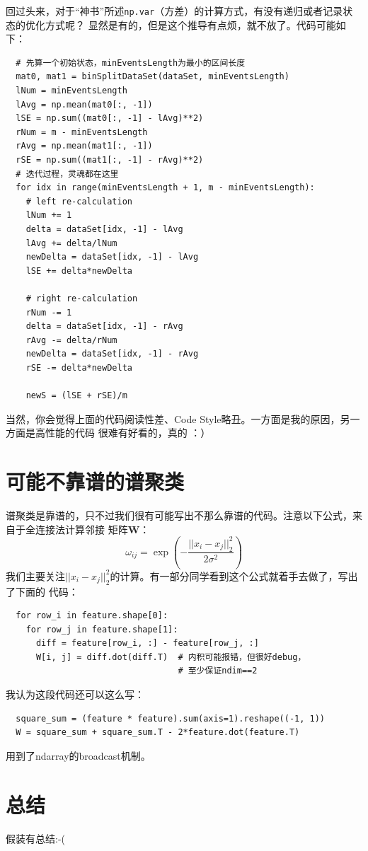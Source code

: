 \documentclass[12pt, a4paper]{article}
\begin{document}
回过头来，对于“神书”所述\texttt{np.var}（方差）的计算方式，有没有递归或者记录状态的优化方式呢？
显然是有的，但是这个推导有点烦，就不放了。代码可能如下：

\begin{lstlisting}
  # 先算一个初始状态，minEventsLength为最小的区间长度
  mat0, mat1 = binSplitDataSet(dataSet, minEventsLength)
  lNum = minEventsLength
  lAvg = np.mean(mat0[:, -1])
  lSE = np.sum((mat0[:, -1] - lAvg)**2)
  rNum = m - minEventsLength
  rAvg = np.mean(mat1[:, -1])
  rSE = np.sum((mat1[:, -1] - rAvg)**2)
  # 迭代过程，灵魂都在这里
  for idx in range(minEventsLength + 1, m - minEventsLength):
    # left re-calculation
    lNum += 1
    delta = dataSet[idx, -1] - lAvg
    lAvg += delta/lNum
    newDelta = dataSet[idx, -1] - lAvg
    lSE += delta*newDelta

    # right re-calculation
    rNum -= 1
    delta = dataSet[idx, -1] - rAvg
    rAvg -= delta/rNum
    newDelta = dataSet[idx, -1] - rAvg
    rSE -= delta*newDelta

    newS = (lSE + rSE)/m
\end{lstlisting}
当然，你会觉得上面的代码阅读性差、Code Style略丑。一方面是我的原因，另一方面是高性能的代码
很难有好看的，真的 ：）

\section{可能不靠谱的谱聚类}
谱聚类是靠谱的，只不过我们很有可能写出不那么靠谱的代码。注意以下公式，来自于全连接法计算邻接
矩阵$\mathbf{W}$：
\[ \omega_{ij}=\exp(-\frac{||x_i-x_j||^2_2}{2\sigma^2}) \]
我们主要关注$||x_i-x_j||^2_2$的计算。有一部分同学看到这个公式就着手去做了，写出了下面的
代码：
\begin{lstlisting}
  for row_i in feature.shape[0]:
    for row_j in feature.shape[1]:
      diff = feature[row_i, :] - feature[row_j, :] 
      W[i, j] = diff.dot(diff.T)  # 内积可能报错，但很好debug，
                                  # 至少保证ndim==2
\end{lstlisting}
我认为这段代码还可以这么写：
\begin{lstlisting}
  square_sum = (feature * feature).sum(axis=1).reshape((-1, 1))
  W = square_sum + square_sum.T - 2*feature.dot(feature.T)
\end{lstlisting}
用到了ndarray的broadcast机制。

\section{总结}
假装有总结:-(
\end{document}
